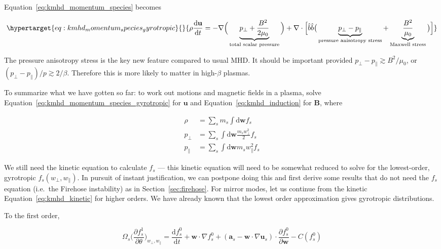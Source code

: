 \documentclass[
  notoc %
]{tufte-book}
\begin{document}
Equation~\ref{eq:kmhd_momentum_species} becomes

\begin{equation}\protect\hypertarget{eq:kmhd_momentum_species_gyrotropic}{}{
\rho\frac{\mathrm{d}\mathbf{u}}{\mathrm{d}t} = -\nabla\Big( \underbrace{p_\perp + \frac{B^2}{2\mu_0}}_{\text{total scalar pressure}} \Big) + \nabla\cdot\Big[ \hat{b}\hat{b}\big( \underbrace{p_\perp - p_\parallel}_{\text{pressure anisotropy stress}} + \underbrace{\frac{B^2}{\mu_0}}_{\text{Maxwell stress}} \big) \Big]
}\label{eq:kmhd_momentum_species_gyrotropic}\end{equation}

The pressure anisotropy stress is the key new feature compared to usual
MHD. It should be important provided
\(p_\perp - p_\parallel \gtrsim B^2/\mu_0\), or
\((p_\perp - p_\parallel)/p \gtrsim 2/\beta\). Therefore this is more
likely to matter in high-\(\beta\) plasmas.

To summarize what we have gotten so far: to work out motions and
magnetic fields in a plasma, solve
Equation~\ref{eq:kmhd_momentum_species_gyrotropic} for \(\mathbf{u}\)
and Equation~\ref{eq:kmhd_induction} for \(\mathbf{B}\), where

\[
\begin{aligned}
\rho &= \sum_s m_s \int \mathrm{d}\mathbf{w}f_s \\
p_\perp &= \sum_s \int \mathrm{d}\mathbf{w}\frac{m_sw_\perp^2}{2}f_s \\
p_\parallel &= \sum_s \int \mathrm{d}\mathbf{w}m_sw_\parallel^2 f_s
\end{aligned}
\]

We still need the kinetic equation to calculate \(f_s\) --- this kinetic
equation will need to be somewhat reduced to solve for the lowest-order,
gyrotropic \(f_s(w_\perp, w_\parallel)\). In pursuit of instant
justification, we can postpone doing this and first derive some results
that do not need the \(f_s\) equation (i.e.~the Firehose instability) as
in Section~\ref{sec:firehose}. For mirror modes, let us continue from
the kinetic Equation~\ref{eq:kmhd_kinetic} for higher orders. We have
already known that the lowest order approximation gives gyrotropic
distributions.

To the first order,

\[
\Omega_s\Big( \frac{\partial f_s^1}{\partial\theta} \Big)_{w_\perp, w_\parallel} = \frac{\mathrm{d} f_s^0}{\mathrm{d}t} + \mathbf{w}\cdot\nabla f_s^0 + ( \mathbf{a}_s -\mathbf{w}\cdot\nabla\mathbf{u}_s )\cdot\frac{\partial f_s^0}{\partial\mathbf{w}} - C(f_s^0)
\]
\end{document}
